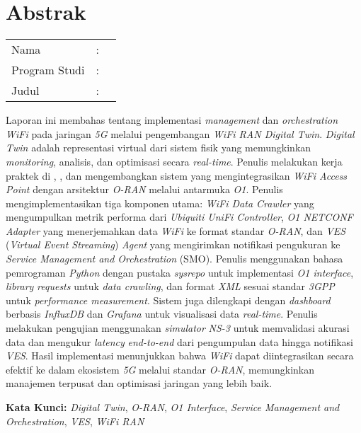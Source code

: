 %
%
%

\chapter*{Abstrak}

\vspace*{0.2cm}
{
	\setlength{\parindent}{0pt}
	
	\begin{tabular}{@{}l l p{10cm}}
		Nama&: & \penulis \\
		Program Studi&: & \program \\
		Judul&: & \judul \\
	\end{tabular}

	\bigskip
	\bigskip

    Laporan ini membahas tentang implementasi \textit{management} dan \textit{orchestration} \textit{WiFi} pada jaringan \textit{5G} melalui pengembangan \textit{WiFi RAN Digital Twin}. \textit{Digital Twin} adalah representasi virtual dari sistem fisik yang memungkinkan \textit{monitoring}, analisis, dan optimisasi secara \textit{real-time}. Penulis melakukan kerja praktek di \namaLab, \namaUniv, dan mengembangkan sistem yang mengintegrasikan \textit{WiFi Access Point} dengan arsitektur \textit{O-RAN} melalui antarmuka \textit{O1}. Penulis mengimplementasikan tiga komponen utama: \textit{WiFi Data Crawler} yang mengumpulkan metrik performa dari \textit{Ubiquiti UniFi Controller}, \textit{O1 NETCONF Adapter} yang menerjemahkan data \textit{WiFi} ke format standar \textit{O-RAN}, dan \textit{VES} (\textit{Virtual Event Streaming}) \textit{Agent} yang mengirimkan notifikasi pengukuran ke \textit{Service Management and Orchestration} (SMO). Penulis menggunakan bahasa pemrograman \textit{Python} dengan pustaka \textit{sysrepo} untuk implementasi \textit{O1 interface}, \textit{library} \textit{requests} untuk \textit{data crawling}, dan format \textit{XML} sesuai standar \textit{3GPP} untuk \textit{performance measurement}. Sistem juga dilengkapi dengan \textit{dashboard} berbasis \textit{InfluxDB} dan \textit{Grafana} untuk visualisasi data \textit{real-time}. Penulis melakukan pengujian menggunakan \textit{simulator} \textit{NS-3} untuk memvalidasi akurasi data dan mengukur \textit{latency} \textit{end-to-end} dari pengumpulan data hingga notifikasi \textit{VES}. Hasil implementasi menunjukkan bahwa \textit{WiFi} dapat diintegrasikan secara efektif ke dalam ekosistem \textit{5G} melalui standar \textit{O-RAN}, memungkinkan manajemen terpusat dan optimisasi jaringan yang lebih baik.


    \vspace{1em}
    \noindent
    \textbf{Kata Kunci:} \textit{Digital Twin}, \textit{O-RAN}, \textit{O1 Interface}, \textit{Service Management and Orchestration}, \textit{VES}, \textit{WiFi RAN}
}

\newpage